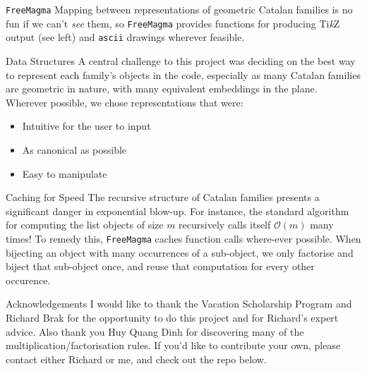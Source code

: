 \documentclass[final]{beamer}
\newlength{\colwidth}
\begin{document}
\begin{frame}[t]
\begin{columns}[t]
\begin{column}{\colwidth}
\begin{alertblock}{\texttt{FreeMagma}}
    Mapping between representations of geometric Catalan families is no fun if we can't \textit{see} them, so \texttt{FreeMagma} provides functions for producing Ti\textit{k}Z output (see left) and \texttt{ascii} drawings wherever feasible.
  \end{alertblock}
  \begin{block}{Data Structures}
    A central challenge to this project was deciding on the best way to represent each family's objects in the code, especially as many Catalan families are geometric in nature, with many equivalent embeddings in the plane. Wherever possible, we chose representations that were:
    \begin{itemize}
      \item Intuitive for the user to input
      \item As canonical as possible
      \item Easy to manipulate 
    \end{itemize}
  \end{block}
  \begin{block}{Caching for Speed}
    The recursive structure of Catalan families presents a significant danger in exponential blow-up. For instance, the standard algorithm for computing the list objects of size $m$ recursively calls itself $\mathcal{O}(m)$ many times! To remedy this, \texttt{FreeMagma} caches function calls where-ever possible. When bijecting an object with many occurrences of a sub-object, we only factorise and biject that sub-object once, and reuse that computation for every other occurence. 
  \end{block}

    


  \begin{block}{Acknowledgements}
    I would like to thank the Vacation Scholarship Program and Richard Brak for the opportunity to do this project and for Richard's expert advice. Also thank you Huy Quang Dinh for discovering many of the multiplication/factorisation rules. If you'd like to contribute your own, please contact either Richard or me, and check out the repo below.
    \begin{multicols}{2}
      \nocite{*}
      \scriptsize{}
    \end{multicols} 
  \end{block}
  


\end{column}
\end{columns}
\end{frame}
\end{document}
